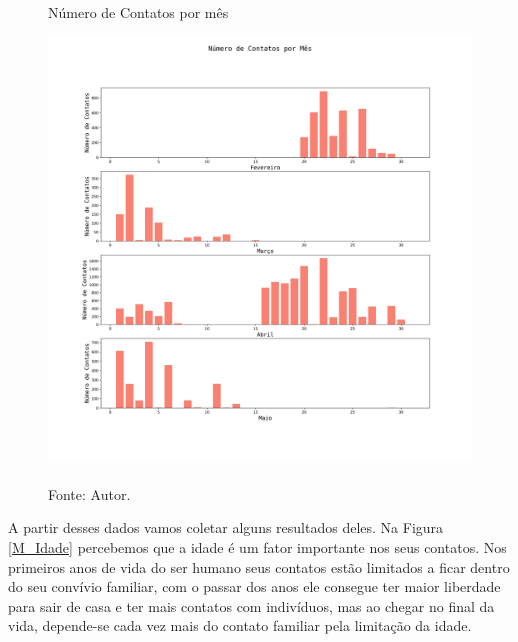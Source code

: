 \begin{figure}[H]
  \centering
  \captionsetup{font=normalsize,skip=1pt,singlelinecheck=on,labelsep=endash}

  \caption{Número de Contatos por mês}

  \includegraphics[scale=0.4]{./img/contatos_mes.jpg}
  \captionsetup{font=small,position=below,skip=-1pt}
   \caption*{\\Fonte: Autor.}
   \label{Idade_mes}
\end{figure}

A partir desses dados vamos coletar alguns resultados deles. Na Figura \ref{M_Idade} percebemos que a idade é um fator importante nos seus contatos. Nos primeiros anos de vida do ser humano seus contatos estão limitados a ficar dentro do seu convívio familiar, com o passar dos anos ele consegue ter maior liberdade para sair de casa e ter mais contatos com indivíduos, mas ao chegar no final da vida, depende-se cada vez mais do contato familiar pela limitação da idade.

